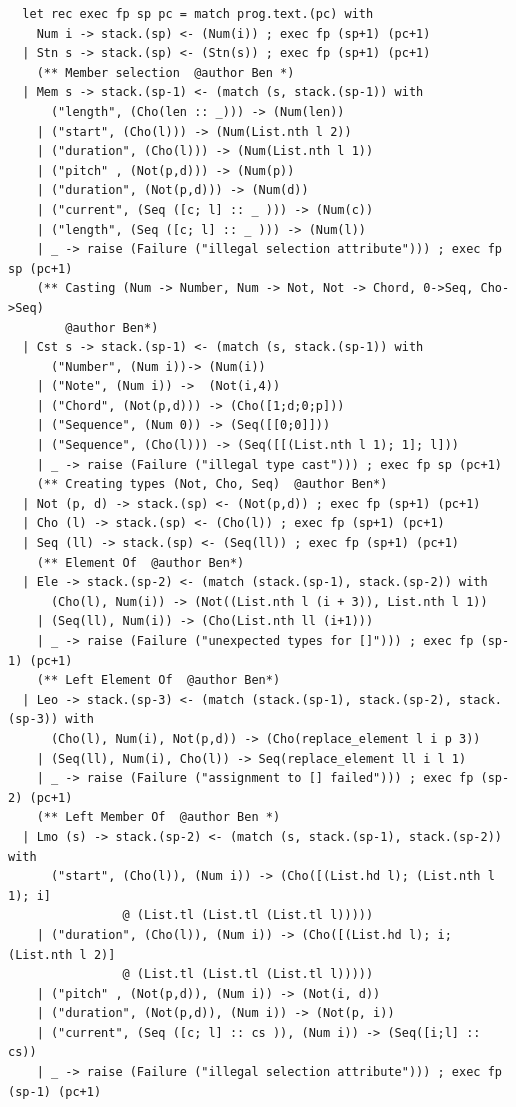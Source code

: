 \documentclass[12pt,A4]{book}
\begin{document}
\begin{verbatim}
  let rec exec fp sp pc = match prog.text.(pc) with
    Num i -> stack.(sp) <- (Num(i)) ; exec fp (sp+1) (pc+1)
  | Stn s -> stack.(sp) <- (Stn(s)) ; exec fp (sp+1) (pc+1)
    (** Member selection  @author Ben *)
  | Mem s -> stack.(sp-1) <- (match (s, stack.(sp-1)) with 
      ("length", (Cho(len :: _))) -> (Num(len))
    | ("start", (Cho(l))) -> (Num(List.nth l 2))
    | ("duration", (Cho(l))) -> (Num(List.nth l 1))
    | ("pitch" , (Not(p,d))) -> (Num(p))
    | ("duration", (Not(p,d))) -> (Num(d))
    | ("current", (Seq ([c; l] :: _ ))) -> (Num(c))
    | ("length", (Seq ([c; l] :: _ ))) -> (Num(l))
    | _ -> raise (Failure ("illegal selection attribute"))) ; exec fp sp (pc+1)
    (** Casting (Num -> Number, Num -> Not, Not -> Chord, 0->Seq, Cho->Seq)
        @author Ben*)
  | Cst s -> stack.(sp-1) <- (match (s, stack.(sp-1)) with 
      ("Number", (Num i))-> (Num(i))
    | ("Note", (Num i)) ->  (Not(i,4))
    | ("Chord", (Not(p,d))) -> (Cho([1;d;0;p]))
    | ("Sequence", (Num 0)) -> (Seq([[0;0]]))
    | ("Sequence", (Cho(l))) -> (Seq([[(List.nth l 1); 1]; l]))
    | _ -> raise (Failure ("illegal type cast"))) ; exec fp sp (pc+1)
    (** Creating types (Not, Cho, Seq)  @author Ben*)
  | Not (p, d) -> stack.(sp) <- (Not(p,d)) ; exec fp (sp+1) (pc+1)
  | Cho (l) -> stack.(sp) <- (Cho(l)) ; exec fp (sp+1) (pc+1)
  | Seq (ll) -> stack.(sp) <- (Seq(ll)) ; exec fp (sp+1) (pc+1)
    (** Element Of  @author Ben*)
  | Ele -> stack.(sp-2) <- (match (stack.(sp-1), stack.(sp-2)) with 
      (Cho(l), Num(i)) -> (Not((List.nth l (i + 3)), List.nth l 1))
    | (Seq(ll), Num(i)) -> (Cho(List.nth ll (i+1)))
    | _ -> raise (Failure ("unexpected types for []"))) ; exec fp (sp-1) (pc+1)
    (** Left Element Of  @author Ben*)
  | Leo -> stack.(sp-3) <- (match (stack.(sp-1), stack.(sp-2), stack.(sp-3)) with 
      (Cho(l), Num(i), Not(p,d)) -> (Cho(replace_element l i p 3))
    | (Seq(ll), Num(i), Cho(l)) -> Seq(replace_element ll i l 1)
    | _ -> raise (Failure ("assignment to [] failed"))) ; exec fp (sp-2) (pc+1)
    (** Left Member Of  @author Ben *)
  | Lmo (s) -> stack.(sp-2) <- (match (s, stack.(sp-1), stack.(sp-2)) with 
      ("start", (Cho(l)), (Num i)) -> (Cho([(List.hd l); (List.nth l 1); i] 
                @ (List.tl (List.tl (List.tl l)))))
    | ("duration", (Cho(l)), (Num i)) -> (Cho([(List.hd l); i; (List.nth l 2)] 
                @ (List.tl (List.tl (List.tl l)))))
    | ("pitch" , (Not(p,d)), (Num i)) -> (Not(i, d))
    | ("duration", (Not(p,d)), (Num i)) -> (Not(p, i))
    | ("current", (Seq ([c; l] :: cs )), (Num i)) -> (Seq([i;l] :: cs))
    | _ -> raise (Failure ("illegal selection attribute"))) ; exec fp (sp-1) (pc+1)

\end{verbatim}
\end{document}
